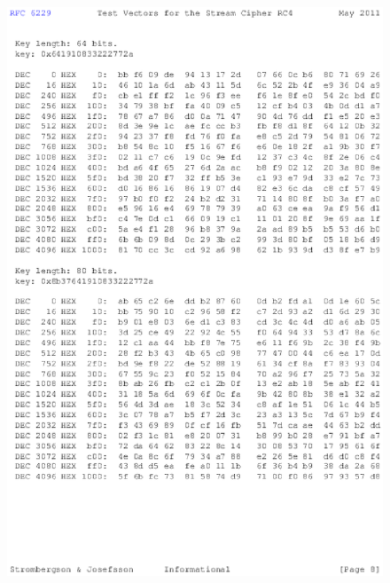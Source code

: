 \begin{anexosenv}
\begin{figure}
\centering
\includegraphics{figuras/file-7}
\end{figure}


\end{anexosenv}

